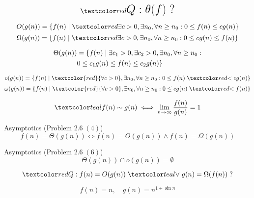 
\begin{frame}{}
  \centerline{}


  \pause
  \vspace{-0.30cm}
  \[
    \red{\text{\LARGE $Q: \theta(f)\;?$}}
  \]
\end{frame}

\begin{frame}{}
  \[
    O(g(n)) = \set{f(n) \mid \red{\exists} c > 0, \exists n_0, \forall n \ge n_0: 0 \le f(n) \le c g(n)}
  \]
  \[
    \Omega(g(n)) = \set{f(n) \mid \red{\exists} c > 0, \exists n_0, \forall n \ge n_0: 0 \le c g(n) \le f(n)}
  \]

  \pause
  \begin{align*}
    \Theta(g(n)) &= \{f(n) \mid \exists c_1 > 0, \exists c_2 >0, \exists n_0, \forall n \ge n_0: \\ 
		& 0 \le c_1 g(n) \le f(n) \le c_2 g(n)\}
  \end{align*}

  \pause
  \[
    o(g(n)) = \set{f(n) \mid \textcolor{red}{\forall c > 0}, \exists n_0, \forall n \ge n_0: 0 \le f(n) \;\red{<}\; c g(n)}
  \]
  \[
    \omega(g(n)) = \set{f(n) \mid \textcolor{red}{\forall c > 0}, \exists n_0, \forall n \ge n_0: 0 \le c g(n) \;\red{<}\; f(n)}
  \]

  \pause
  \[
    \teal{f(n) \sim g(n) \iff \lim_{n \to \infty} \frac{f(n)}{g(n)} = 1}
  \]
\end{frame}

\begin{frame}{}
  \begin{exampleblock}{Asymptotics (Problem $2.6\; (4)$)}
    \[
      f(n) = \Theta(g(n)) \iff f(n) = O(g(n)) \land f(n) = \Omega(g(n))
    \]
  \end{exampleblock}


  \pause
  \vspace{0.50cm}
  \begin{exampleblock}{Asymptotics (Problem $2.6\; (6)$)}
    \[
      \Theta(g(n)) \cap o(g(n)) = \emptyset
    \]
  \end{exampleblock}

  \pause
  \vspace{0.30cm}
  \[
    \red{Q:}\; f(n) = O(g(n)) \;\teal{\lor}\; g(n) = \Omega(f(n)) \;?
  \]

  \pause
  \[
    f(n) = n, \quad g(n) = n^{1 + \sin n}
  \]
\end{frame}


